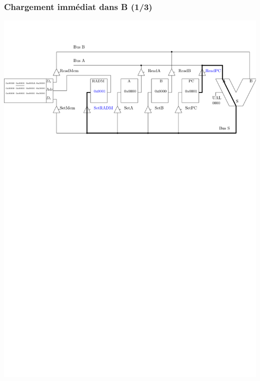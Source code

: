\documentclass{beamer}
\begin{document}
\begin{frame}
\frametitle{Chargement immédiat dans B (1/3)}
\centering\includegraphics[width=\linewidth]{Figs/premier_chemin_ldb_1.pdf}
\end{frame}
\end{document}
